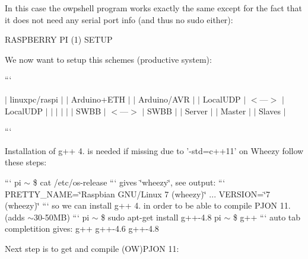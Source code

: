 In this case the {\ttfamily owpshell} program works exactly the same except for the fact that it does not need any serial port info (and thus no sudo either)\-: 


R\-A\-S\-P\-B\-E\-R\-R\-Y P\-I (1) S\-E\-T\-U\-P

We now want to setup this schemes (productive system)\-:

``` 

 $\vert$ linuxpc/raspi $\vert$ $\vert$ Arduino+\-E\-T\-H $\vert$ $\vert$ Arduino/\-A\-V\-R $\vert$ $\vert$ Local\-U\-D\-P $\vert$ $<$---$>$ $\vert$ Local\-U\-D\-P $\vert$ $\vert$ $\vert$ $\vert$ $\vert$ $\vert$ S\-W\-B\-B $\vert$ $<$---$>$ $\vert$ S\-W\-B\-B $\vert$ $\vert$ Server $\vert$ $\vert$ Master $\vert$ $\vert$ Slaves $\vert$ 

 ```

Installation of g++ 4. is needed if missing due to '-\/std=c++11' on Wheezy follow these steps\-:

``` pi $\sim$ \$ cat /etc/os-\/release ``` gives \char`\"{}wheezy\char`\"{}, see output\-: ``` P\-R\-E\-T\-T\-Y\-\_\-\-N\-A\-M\-E=\char`\"{}\-Raspbian G\-N\-U/\-Linux 7 (wheezy)\char`\"{} ... V\-E\-R\-S\-I\-O\-N=\char`\"{}7 (wheezy)\char`\"{} ``` so we can install g++ 4. in order to be able to compile P\-J\-O\-N 11. (adds $\sim$30-\/50\-M\-B) ``` pi $\sim$ \$ sudo apt-\/get install g++-\/4.8 pi $\sim$ \$ g++ ``` auto tab completition gives\-: g++ g++-\/4.6 g++-\/4.8

Next step is to get and compile (O\-W)P\-J\-O\-N 11\-:

